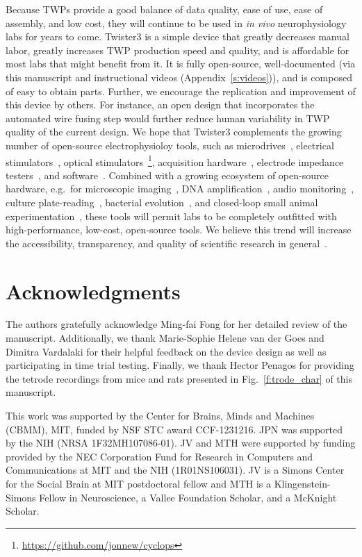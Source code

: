 \documentclass[11pt,a4paper]{article}
\begin{document}
Because TWPs provide a good balance of data quality, ease of use, ease of
assembly, and low cost, they will continue to be used in \textit{in vivo}
neurophysiology labs for years to come. Twister3 is a simple device that
greatly decreases manual labor, greatly increases TWP production speed and
quality, and is affordable for most labs that might benefit from it. It is
fully open-source, well-documented (via this manuscript and instructional
videos (Appendix~\ref{s:videos})), and is composed of easy to obtain parts.
Further, we encourage the replication and improvement of this device by others.
For instance, an open design that incorporates the automated wire fusing step
would further reduce human variability in TWP quality of the current design. We
hope that Twister3 complements the growing number of open-source
electrophysioloy tools, such as
microdrives~\cite{Kloosterman2009,Voigts2013}, electrical
stimulators~\cite{Cermak2019}, optical
stimulators~\cite{Newman2015}\footnote{\url{https://github.com/jonnew/cyclops}},
acquisition hardware~\cite{Siegle2017}, electrode impedance
testers~\cite{Matsumoto2019}, and software~\cite{Newman2012b, Siegle2017,
Lopes2015}. Combined with a growing ecosystem of open-source hardware, e.g.\
for microscopic imaging~\cite{Cai2016,Voigt2019,MIMMS}, DNA
amplification~\cite{OpenPCR}, audio monitoring~\cite{Hill2018}, culture
plate-reading~\cite{Szymula2019}, bacterial evolution~\cite{Takahashi2015}, and
closed-loop small animal experimentation~\cite{Maia2017,Moreira2019}, these
tools will permit labs to be completely outfitted with high-performance,
low-cost, open-source tools. We believe this trend will increase the
accessibility, transparency, and quality of scientific research in
general~\cite{Siegle2015}.

\section*{Acknowledgments}
The authors gratefully acknowledge Ming-fai Fong for her detailed review of the
manuscript. Additionally, we thank Marie-Sophie Helene van der Goes and Dimitra
Vardalaki for their helpful feedback on the device design as well as
participating in time trial testing. Finally, we thank Hector Penagos for
providing the tetrode recordings from mice and rats presented in
Fig.~\ref{f:trode_char} of this manuscript.

This work was supported by the Center for Brains, Minds and Machines (CBMM),
MIT, funded by NSF STC award CCF-1231216. JPN was supported by the NIH (NRSA
1F32MH107086-01). JV and MTH were supported by funding provided by the NEC
Corporation Fund for Research in Computers and Communications at MIT and the
NIH (1R01NS106031). JV is a Simons Center for the Social Brain at MIT
postdoctoral fellow and MTH is a Klingenstein-Simons Fellow in Neuroscience, a
Vallee Foundation Scholar, and a McKnight Scholar.
\end{document}
